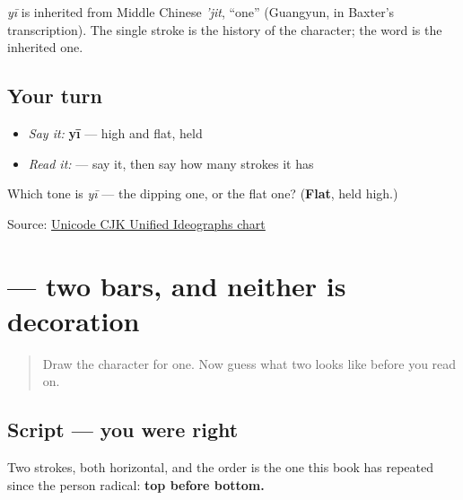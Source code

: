 \begin{cousinweb}
\textbf{} \emph{yī} is inherited from Middle Chinese \emph{'jit}, \textquotedblleft{}one\textquotedblright{} (Guangyun, in Baxter's transcription). The single stroke is the history of the character; the word is the inherited one.
\end{cousinweb}

\subsection*{Your turn}
\begin{itemize}
\raggedright
  \item \emph{Say it:} \textbf{yī} — high and flat, held
  \item \emph{Read it:}  — say it, then say how many strokes it has
\end{itemize}

\begin{tcolorbox}[breakable,colback=teal!4,colframe=teal!35!black,title={Before you move on}]
Which tone is \emph{yī} — the dipping one, or the flat one? (\textbf{Flat}, held high.)

Source: \href{https://www.unicode.org/charts/PDF/U4E00.pdf}{Unicode CJK Unified Ideographs chart}
\end{tcolorbox}
\section[\texorpdfstring{\zh{二} (èr)}{二 (èr)}]{ — two bars, and neither is decoration}

\label{lesson:ZH-W03-er}



\begin{quote}
Draw the character for one. Now guess what two looks like before you read on.
\end{quote}

\subsection*{Script — you were right}

\begin{quote}
\end{quote}

Two strokes, both horizontal, and the order is the one this book has repeated since the person radical: \textbf{top before bottom.}

